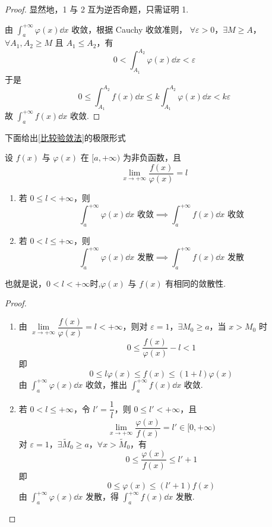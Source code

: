 \begin{proof}
	显然地，1 与 2 互为逆否命题，只需证明 1.
	
	由 $\displaystyle\int_a^{+\infty} \varphi(x)\dd x$ 收敛，根据 Cauchy 收敛准则，
	$\forall \varepsilon>0$，$\exists M \ge A$，$\forall A_1,A_2 \ge M$ 且 $A_1 \le A_2$，有
	\[
	0 < \int_{A_1}^{A_2} \varphi(x)\dd x < \varepsilon
	\]
	于是
	\[
	0 \le \int_{A_1}^{A_2} f(x)\dd x \le k \int_{A_1}^{A_2} \varphi(x)\dd x < k\varepsilon
	\]
	故 $\displaystyle\int_a^{+\infty} f(x)\dd x$ 收敛.
\end{proof} 
下面给出\ref{比较验敛法}的极限形式
\begin{corollary}
	设 $f(x)$ 与 $\varphi(x)$ 在 $[a,+\infty)$ 为非负函数，且
	\[
	\lim_{x \to +\infty} \frac{f(x)}{\varphi(x)} = l
	\]
	\begin{enumerate}
		\item 若 $0 \le l < +\infty$，则
		\[
		\int_a^{+\infty} \varphi(x)\dd x \text{ 收敛} \implies \int_a^{+\infty} f(x)\dd x \text{ 收敛}
		\] 
		\item  若 $0 < l \le +\infty$，则
		\[
		\int_a^{+\infty} \varphi(x)\dd x \text{ 发散} \implies \int_a^{+\infty} f(x)\dd x \text{ 发散}
		\]
	\end{enumerate}
	
	也就是说，$0<l<+\infty$时,$\varphi(x)$ 与 $f(x)$ 有相同的敛散性.
	
\end{corollary}
\begin{proof}
	\begin{enumerate}
		\item 由 $\lim\limits_{x \to +\infty} \dfrac{f(x)}{\varphi(x)} = l < +\infty$，则对 $\varepsilon=1$，$\exists M_0 \ge a$，当 $x > M_0$ 时
		\[
		0 \le \frac{f(x)}{\varphi(x)} - l < 1
		\]
		即
		\[
		0 \le l\varphi(x) \le f(x) \le (1+l)\varphi(x)
		\]
		由 $\displaystyle\int_a^{+\infty} \varphi(x)\dd x$ 收敛，推出 $\displaystyle\int_a^{+\infty} f(x)\dd x$ 收敛.
		
		\item 若 $0 < l \le +\infty$，令 $l' = \dfrac{1}{l}$，则 $0 \le l' < +\infty$，且
		\[
		\lim_{x \to +\infty} \frac{\varphi(x)}{f(x)} = l' \in [0,+\infty)
		\]
		对 $\varepsilon=1$，$\exists \widetilde{M}_0 \ge a$，$\forall x > \widetilde{M}_0$，有
		\[
		0 \le \frac{\varphi(x)}{f(x)} \le l' + 1
		\]
		即
		\[
		0 \le \varphi(x) \le (l'+1)f(x)
		\]
		由 $\displaystyle\int_a^{+\infty} \varphi(x)\dd x$ 发散，得 $\displaystyle\int_a^{+\infty} f(x)\dd x$ 发散.
	\end{enumerate}
\end{proof}
